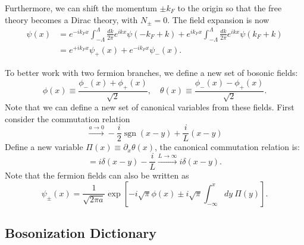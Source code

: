 Furthermore, we can shift the momentum $\pm k_F$ to the origin so that the free theory becomes a Dirac theory, with $N_{\pm}=0$.
The field expansion is now
\begin{equation}
\begin{aligned}
	\psi(x) &= e^{-ik_Fx} \int_{-\Lambda}^\Lambda \frac{dk}{2\pi} e^{ikx} \psi(-k_F+k)
	+ e^{ik_Fx} \int_{-\Lambda}^\Lambda \frac{dk}{2\pi} e^{ikx} \psi(k_F+k) \\
	&= e^{+ik_F x}\psi_+(x) + e^{-ik_F x}\psi_-(x).
\end{aligned}
\end{equation}

To better work with two fermion branches, we define a new set of bosonic fields:
\begin{equation}
	\phi(x) \equiv \frac{\phi_-(x) + \phi_+(x)}{\sqrt 2}, \quad
	\theta(x) \equiv \frac{\phi_-(x) - \phi_+(x)}{\sqrt 2}.
\end{equation}
Note that we can define a new set of canonical variables from these fields.
First consider the commutation relation
\begin{equation}
	[\phi(x),\theta(y)] \stackrel{ a \rightarrow 0}{\longrightarrow} 
		-\frac{i}{2} \operatorname{sgn}(x-y) + \frac{i}{L}(x-y)
\end{equation}
Define a new variable $\Pi(x) \equiv \partial_x\theta(x)$, the canonical commutation relation is:
\begin{equation}
	[\phi(x), \Pi(y)] = i \delta(x-y) - \frac{i}{L} \stackrel{L \rightarrow \infty}{\longrightarrow} i\delta(x-y).
\end{equation}
Note that the fermion fields can also be written as
\begin{equation}
	\psi_{\pm}(x) = \frac{1}{\sqrt{2\pi a}} \exp\left[-i\sqrt{\pi} \phi(x) \pm i\sqrt{\pi} \int^x_{-\infty} dy\ \Pi(y) \right].
\end{equation}


\subsection{Bosonization Dictionary}
